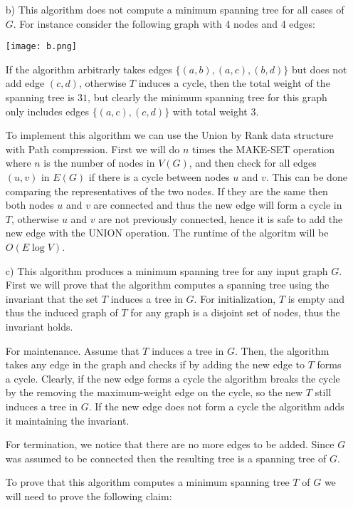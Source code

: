 \documentclass[a4paper, 11pt]{article}
\begin{document}
\begin{itemize}
	\item [b)] This algorithm does not compute a minimum spanning tree for all cases of $G$. For instance consider the following graph with 4 nodes and 4 edges:

	\begin{center}
		\texttt{[image: b.png]}
	\end{center}	

	If the algorithm arbitrarly takes edges $\{(a, b), (a, c), (b, d)\}$ but does not add edge $(c, d)$, otherwise $T$ induces a cycle, then the total weight of the spanning tree is $31$, but clearly the minimum spanning tree for this graph only includes edges $\{(a, c), (c, d)\}$ with total weight 3. 

	To implement this algorithm we can use the Union by Rank data structure with Path compression. First we will do $n$ times the MAKE-SET operation where $n$ is the number of nodes in $V(G)$, and then check for all edges $(u, v)$ in $E(G)$ if there is a cycle between nodes $u$ and $v$. This can be done comparing the representatives of the two nodes. If they are the same then both nodes $u$ and $v$ are connected and thus the new edge will form a cycle in $T$, otherwise $u$ and $v$ are not previously connected, hence it is safe to add the new edge with the UNION operation. The runtime of the algoritm will be $O(E \log V)$.

	\item [c)] This algorithm produces a minimum spanning tree for any input graph $G$. First we will prove that the algorithm computes a spanning tree using the invariant that the set $T$ induces a tree in $G$. For initialization, $T$ is empty and thus the induced graph of $T$ for any graph is a disjoint set of nodes, thus the invariant holds. 

	For maintenance. Assume that $T$ induces a tree in $G$. Then, the algorithm takes any edge in the graph and checks if by adding the new edge to $T$ forms a cycle. Clearly, if the new edge forms a cycle the algorithm breaks the cycle by the removing the maximum-weight edge on the cycle, so the new $T$ still induces a tree in $G$. If the new edge does not form a cycle the algorithm adds it maintaining the invariant. 

	For termination, we notice that there are no more edges to be added. Since $G$ was assumed to be connected then the resulting tree is a spanning tree of $G$.

	To prove that this algorithm computes a minimum spanning tree $T$ of $G$ we will need to prove the following claim:


\end{itemize}
\end{document}
